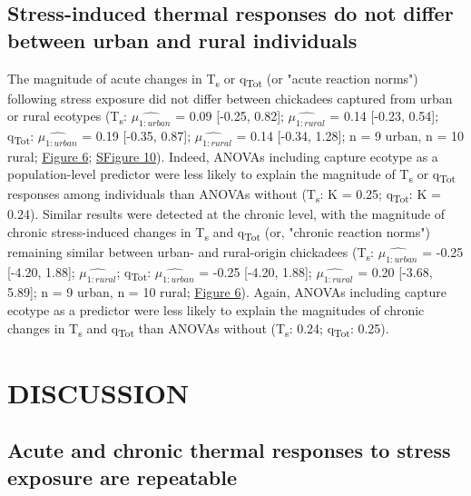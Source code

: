 \documentclass[12pt]{article}
\begin{document}
\subsection{Stress-induced thermal responses do not differ between urban and rural individuals}
\vspace{0.5cm}

\noindent The magnitude of acute changes in T\textsubscript{s} or q\textsubscript{Tot} (or "acute reaction norms") following stress exposure did not differ between chickadees captured from urban or rural ecotypes (T\textsubscript{s}: $\hat{\mu_{1:\mathit{urban}}}$ = 0.09 [-0.25, 0.82]; $\hat{\mu_{1:\mathit{rural}}}$ = 0.14 [-0.23, 0.54]; q\textsubscript{Tot}: $\hat{\mu_{1:\mathit{urban}}}$ = 0.19 [-0.35, 0.87]; $\hat{\mu_{1:\mathit{rural}}}$ = 0.14 [-0.34, 1.28]; n = 9 urban, n = 10 rural; \hyperref[Fig4.6]{Figure 6}; \hyperref[FigC.10]{SFigure 10}). Indeed, ANOVAs including capture ecotype as a population-level predictor were less likely to explain the magnitude of T\textsubscript{s} or q\textsubscript{Tot} responses among individuals than ANOVAs without (T\textsubscript{s}: K = 0.25; q\textsubscript{Tot}: K = 0.24). Similar results were detected at the chronic level, with the magnitude of chronic stress-induced changes in T\textsubscript{s} and q\textsubscript{Tot} (or, "chronic reaction norms") remaining similar between urban- and rural-origin chickadees (T\textsubscript{s}: $\hat{\mu_{1:\mathit{urban}}}$ = -0.25 [-4.20, 1.88]; $\hat{\mu_{1:\mathit{rural}}}$; q\textsubscript{Tot}: $\hat{\mu_{1:\mathit{urban}}}$ = -0.25 [-4.20, 1.88]; $\hat{\mu_{1:\mathit{rural}}}$ = 0.20 [-3.68, 5.89]; n = 9 urban, n = 10 rural; \hyperref[Fig4.6]{Figure 6}). Again, ANOVAs including capture ecotype as a predictor were less likely to explain the magnitudes of chronic changes in T\textsubscript{s} and q\textsubscript{Tot} than ANOVAs without (T\textsubscript{s}: 0.24; q\textsubscript{Tot}: 0.25). 

\section{DISCUSSION}

\subsection{Acute and chronic thermal responses to stress exposure are repeatable}
\vspace{0.5cm}
\end{document}
